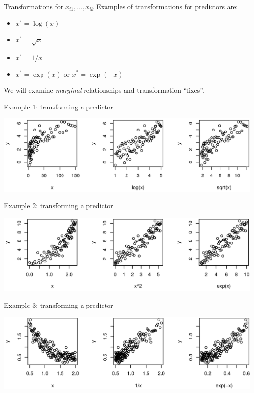 \documentclass{beamer}
\begin{document}
\begin{frame}{Transformations for $x_{i1},\ldots,x_{ik}$}
Examples of transformations for predictors are:
\begin{itemize}
\item $x^\ast=\log(x)$
\item $x^\ast=\sqrt{x}$
\item $x^\ast=1/x$
\item $x^\ast=\exp(x)$ or $x^\ast=\exp(-x)$
\end{itemize}
We will examine \textit{marginal} relationships and transformation ``fixes''. %
\end{frame}

\begin{frame}{Example 1: transforming a predictor}
\centerline{\includegraphics[scale=0.25]{plots/transf1}}
\end{frame}

\begin{frame}{Example 2: transforming a predictor}
\centerline{\includegraphics[scale=0.25]{plots/transf2}}
\end{frame}

\begin{frame}{Example 3: transforming a predictor}
\centerline{\includegraphics[scale=0.25]{plots/transf3}}
\end{frame}
\end{document}
